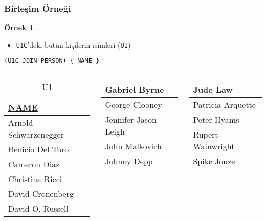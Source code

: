 \documentclass[dvipsnames]{beamer}
\theoremstyle{definition}
\theoremstyle{example}
\newtheorem{ornek}[theorem]{Örnek}
\theoremstyle{plain}
\begin{document}
\begin{frame}[fragile]
  \frametitle{Birleşim Örneği}

  \begin{ornek}
    \begin{itemize}
      \item \texttt{U1C}'deki bütün kişilerin isimleri (\texttt{U1})
    \end{itemize}

    \begin{lstlisting}
(U1C JOIN PERSON) { NAME }
    \end{lstlisting}

    \pause
    \vspace{-10pt}
    \begin{columns}[b]
      \begin{tiny}
      \begin{table}
        \caption{U1}
        \begin{tabular}{|l|}\hline
\underline{NAME}     \\[2pt]\hline\hline
Arnold Schwarzenegger\\\hline
Benicio Del Toro     \\\hline
Cameron Diaz         \\\hline
Christina Ricci      \\\hline
David Cronenberg     \\\hline
David O. Russell     \\\hline
        \end{tabular}
      \end{table}
      \end{tiny}

      \begin{tiny}
      \begin{table}
        \begin{tabular}{|l|}\hline
Gabriel Byrne        \\\hline
George Clooney       \\\hline
Jennifer Jason Leigh \\\hline
John Malkovich       \\\hline
Johnny Depp          \\\hline
        \end{tabular}
      \end{table}
      \end{tiny}

      \begin{tiny}
      \begin{table}
        \begin{tabular}{|l|}\hline
Jude Law             \\\hline
Patricia Arquette    \\\hline
Peter Hyams          \\\hline
Rupert Wainwright    \\\hline
Spike Jonze          \\\hline
        \end{tabular}
      \end{table}
      \end{tiny}


\end{columns}
\end{ornek}
\end{frame}
\end{document}
